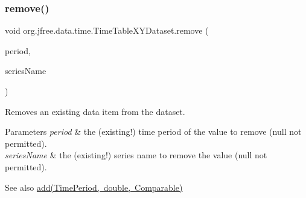 \mbox{\label{classorg_1_1jfree_1_1data_1_1time_1_1_time_table_x_y_dataset_a6b46443bd273fa361e8b15a8f86413a0}} 
\subsubsection{\texorpdfstring{remove()}{remove()}\hspace{0.1cm}{\footnotesize\ttfamily [1/2]}}
{\footnotesize\ttfamily void org.\+jfree.\+data.\+time.\+Time\+Table\+X\+Y\+Dataset.\+remove (\begin{DoxyParamCaption}\item[{\mbox{\hyperlink{interfaceorg_1_1jfree_1_1data_1_1time_1_1_time_period}{Time\+Period}}}]{period,  }\item[{Comparable}]{series\+Name }\end{DoxyParamCaption})}

Removes an existing data item from the dataset.


\begin{DoxyParams}{Parameters}
{\em period} & the (existing!) time period of the value to remove ({\ttfamily null} not permitted). \\
\hline
{\em series\+Name} & the (existing!) series name to remove the value ({\ttfamily null} not permitted).\\
\hline
\end{DoxyParams}
\begin{DoxySeeAlso}{See also}
\mbox{\hyperlink{classorg_1_1jfree_1_1data_1_1time_1_1_time_table_x_y_dataset_a61e4bdaac4e5b2bb7164fbf313cbc26a}{add(\+Time\+Period, double, Comparable)}} 
\end{DoxySeeAlso}
\mbox{\label{classorg_1_1jfree_1_1data_1_1time_1_1_time_table_x_y_dataset_a186750aa0c3fea5e93a4bd05bea01f6c}} 
